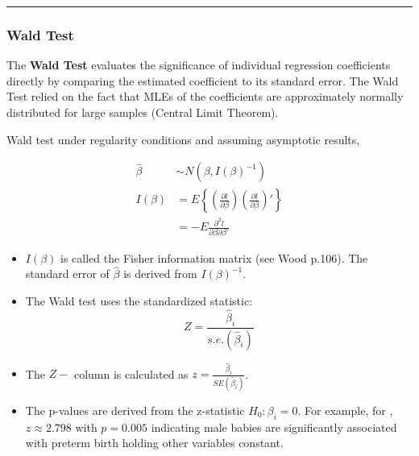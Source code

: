\documentclass[
  letterpaper,
  DIV=11,
  numbers=noendperiod]{scrreprt}
\begin{document}
\begin{center}\rule{0.5\linewidth}{0.5pt}\end{center}

\hypertarget{wald-test}{%
\subsubsection*{Wald Test}\label{wald-test}}

The \textbf{Wald Test} evaluates the significance of individual
regression coefficients directly by comparing the estimated coefficient
to its standard error. The Wald Test relied on the fact that MLEs of the
coefficients are approximately normally distributed for large samples
(Central Limit Theorem).

\begin{tcolorbox}[enhanced jigsaw, rightrule=.15mm, breakable, left=2mm, colframe=quarto-callout-note-color-frame, opacityback=0, leftrule=.75mm, toprule=.15mm, colback=white, arc=.35mm, bottomrule=.15mm]

Wald test under regularity conditions and assuming asymptotic results,

\[
\begin{align}
\hat{\beta} &\sim N(\beta, I(\beta)^{-1})\\
I(\beta) &= E\left\{\left(\frac{\partial l}{\partial \beta}\right)\left(\frac{\partial l}{\partial \beta}\right)'\right\}\\
&= -E\frac{\partial^2 l}{\partial \beta \partial \beta'}
\end{align}
\]

\begin{itemize}
\item
  \(I(\beta)\) is called the Fisher information matrix (see Wood p.106).
  The standard error of \(\hat{\beta}\) is derived from
  \(I(\beta)^{-1}\).
\item
  The Wald test uses the standardized statistic: \[
  Z = \frac{\hat{\beta}_i}{s.e.(\hat{\beta}_i)}
  \]
\end{itemize}

\end{tcolorbox}

\begin{itemize}
\item
  The \(Z-\) column is calculated as
  \(z = \frac{\hat{\beta}_i}{SE(\hat{\beta}_i)}\).
\item
  The p-values are derived from the z-statistic \(H_0 : \beta_i = 0\).
  For example, for , \(z \approx 2.798\) with \(p=0.005\)
  indicating male babies are significantly associated with preterm birth
  holding other variables constant.
\end{itemize}
\end{document}
